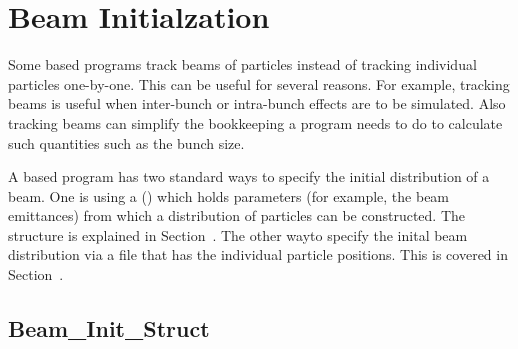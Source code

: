 \chapter{Beam Initialzation}
\label{c:beam.init}

Some \bmad based programs track beams of particles instead of tracking individual particles
one-by-one. This can be useful for several reasons. For example, tracking beams is useful when
inter-bunch or intra-bunch effects are to be simulated. Also tracking beams can simplify the
bookkeeping a program needs to do to calculate such quantities such as the bunch size.

A \bmad based program has two standard ways to specify the initial distribution of a beam. One is
using a   () which holds parameters (for
example, the beam emittances) from which a distribution of particles can be constructed. The
 structure is explained in Section~. The other wayto
specify the inital beam distribution via a file that has the individual particle positions. This is
covered in Section~.

\section{Beam_Init_Struct}
\label{s:beam.init.struct}

